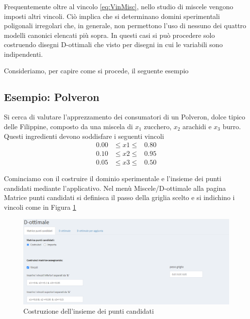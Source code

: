 \documentclass[
  11pt,
]{book}
\begin{document}
Frequentemente oltre al vincolo \eqref{eq:VinMisc}, nello studio di miscele vengono imposti altri vincoli. Ciò implica che si determinano domini sperimentali poligonali irregolari che, in generale, non permettono l'uso di nessuno dei quattro modelli canonici elencati più sopra. In questi casi si può procedere solo costruendo disegni D-ottimali che visto per disegni in cui le variabili sono indipendenti.

Consideriamo, per capire come si procede, il seguente esempio

\hypertarget{esempio-polveron}{%
\subsection{Esempio: Polveron}\label{esempio-polveron}}

Si cerca di valutare l'apprezzamento dei consumatori di un Polveron, dolce tipico delle Filippine, composto da una miscela di \(x_1\) zucchero, \(x_2\) arachidi e \(x_3\) burro.\\
Questi ingredienti devono soddisfare i seguenti vincoli
\begin{eqnarray*}
  0.00& \leq x1 \leq & 0.80\\
  0.10&\leq x2 \leq & 0.95 \\
  0.05&\leq x3 \leq & 0.50
\end{eqnarray*}

Cominciamo con il costruire il dominio sperimentale e l'insieme dei punti candidati mediante l'applicativo. Nel menù Miscele/D-ottimale alla pagina Matrice punti candidati si definisca il passo della griglia scelto e si indichino i vincoli come in Figura \ref{fig:mixfig17}

\begin{figure}[ht]

{\centering \includegraphics[width=1\linewidth]{Immagini/Mixt/17_cp} 

}

\caption{Costruzione dell'insieme dei punti candidati}\label{fig:mixfig17}
\end{figure}
\end{document}
